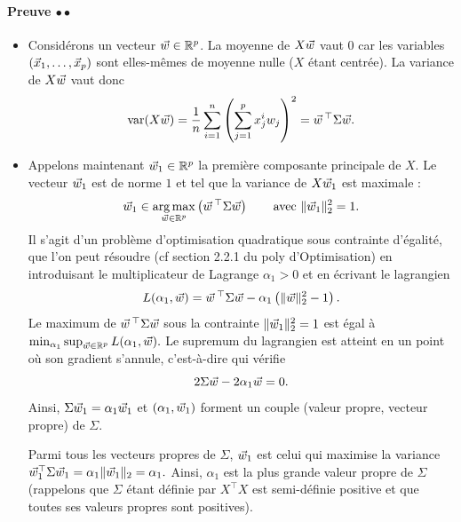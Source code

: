 \paragraph{Preuve  $\bullet\bullet$}
\begin{itemize}
\item Considérons un vecteur $\ww \in \RR^p$. 
La moyenne de $X \ww$ vaut $0$ car les variables $(\xx_1, \dots, \xx_p)$ sont
elles-mêmes de moyenne nulle ($X$ étant centrée).
La variance de $X \ww$ vaut donc 
\begin{equation*}
  \text{var}(X \ww) = \frac1n \sum_{i=1}^n \left( \sum_{j=1}^p x_j^i w_j \right)^2 = \ww^\top \Sigma \ww.
\end{equation*}    
\item Appelons maintenant $\ww_1 \in \RR^p$ la première composante principale de $X$.
Le vecteur $\ww_1$ est de norme $1$ et tel que la variance de $X \ww_1$ est maximale :
\begin{equation}
  \label{eq:pc1}
  \ww_1 \in \argmax_{\ww \in \RR^p} \left( \ww^\top \Sigma \ww \right)  \text{\qquad avec } \ltwonorm{\ww_1}^2=1.
\end{equation}
Il s'agit d'un problème d'optimisation quadratique sous contrainte d'égalité,
que l'on peut résoudre (cf section 2.2.1 du poly d'Optimisation) en
introduisant le multiplicateur de Lagrange $\alpha_1 > 0$ et en écrivant le
lagrangien
\begin{equation*}
  L(\alpha_1, \ww) = \ww^\top \Sigma \ww - \alpha_1 
  \left( \ltwonorm{\ww}^2 - 1 \right).
\end{equation*}
Le maximum de $\ww^\top \Sigma \ww$ sous la contrainte $\ltwonorm{\ww_1}^2=1$ est
égal à $\min_{\alpha_1} \sup_{\ww \in \RR^p} L(\alpha_1, \ww).$ Le supremum du
lagrangien est atteint en un point où son gradient s'annule, c'est-à-dire qui
vérifie
\begin{equation*}
  2 \Sigma \ww - 2 \alpha_1 \ww = 0.
\end{equation*}
Ainsi, $\Sigma \ww_1 = \alpha_1 \ww_1$ et $(\alpha_1, \ww_1)$ forment un couple
(valeur propre, vecteur propre) de $\Sigma$.

Parmi tous les vecteurs propres de $\Sigma$, $\ww_1$ est celui qui maximise la
variance $\ww_1^\top \Sigma \ww_1 = \alpha_1 \ltwonorm{\ww_1} = \alpha_1.$
Ainsi, $\alpha_1$ est la plus grande valeur propre de $\Sigma$ (rappelons que
$\Sigma$ étant définie par $X^\top X$ est semi-définie positive et que toutes
ses valeurs propres sont positives).


\end{itemize}
